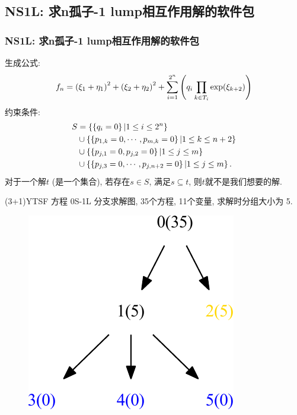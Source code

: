 \subsection{NS1L: 求n孤子-1 lump相互作用解的软件包}
\begin{frame}
\frametitle{NS1L: 求n孤子-1 lump相互作用解的软件包}
生成公式:
\[
    f_n=\left(\xi_1+\eta_1\right)^2+\left(\xi_2+\eta_2\right)^2+\sum_{i=1}^{2^n}\left(q_i\prod_{k \in T_i}{\exp(\xi_{k+2})}\right)
\]
约束条件:
\[
\begin{split}
    S&=\left\{\left\{q_i=0\right\}|1\le i \le 2^n\right\} \\ 
        &\cup \left\{\left\{p_{1,k}=0,\cdots,p_{m,k}=0\right\}|1\le k \le n+2\right\}  \\
        &\cup \left\{\left\{p_{j,1}=0,p_{j,2}=0\right\}|1\le j \le m\right\} \\ 
        &\cup \left\{\left\{p_{j,3}=0,\cdots,p_{j,n+2}=0\right\}|1\le j \le m\right\} . 
\end{split}
\]
对于一个解$t$ (是一个集合), 若存在$s\in S$, 满足$s\subseteq t$, 则$t$就不是我们想要的解.
\end{frame}

\begin{frame}
(3+1)YTSF 方程 0S-1L 分支求解图, 35个方程, 11个变量, 求解时分组大小为 5.
\begin{figure}
\centering
\includegraphics[width=.5\textwidth]{../paper/fig/0S1L.pdf}
\end{figure}
\end{frame}

